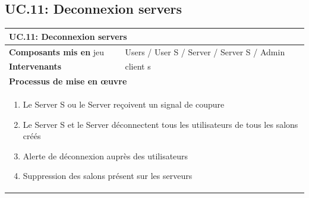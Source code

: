 \documentclass[a4paper,11pt,french]{article}
\begin{document}
\subsection{UC.11: Deconnexion servers}
\begin{center}
	\vspace*{0.7cm}
	\begin{tabularx}{16cm}{|l|X|}
	\hline
	\multicolumn{2}{|l|}{\textbf{UC.11: Deconnexion servers}}\\
	\hline
	\textbf{Composants mis en} jeu & Users / User S / Server / Server S / Admin \\
	\hline
	\textbf{Intervenants} & client s \\
	\hline
	\multicolumn{2}{|l|}{\textbf{Processus de mise en \oe uvre}}\\
	\hline
	\multicolumn{2}{|p{15cm}|}{\begin{enumerate}\item Le Server S ou le Server re\c coivent un signal de coupure \item Le Server S et le Server déconnectent tous les utilisateurs de tous les salons créés \item Alerte de déconnexion auprès des utilisateurs \item Suppression des salons présent sur les serveurs \end{enumerate}}\\
	\hline
	\end{tabularx}
\end{center}

\end{document}
